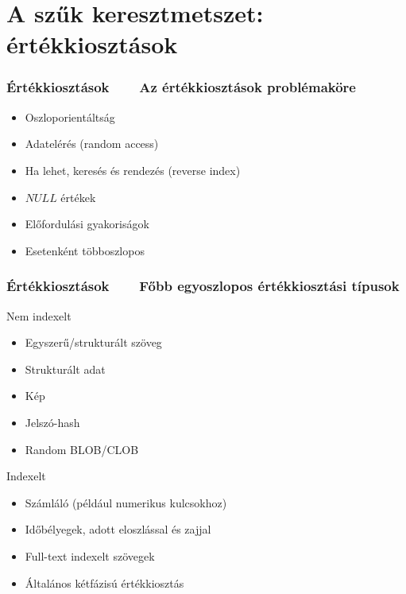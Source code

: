 \documentclass[
]{beamer}
\newcommand{\slidetitle}[2]{\frametitle{{\small #1 ~ \ding{226} ~ } \normalsize \textbf{#2} }}
\begin{document}
\section{A szűk keresztmetszet: értékkiosztások}
\def\sectionshorttitle{Értékkiosztások}

\begin{frame}
    \slidetitle{\sectionshorttitle}{Az értékkiosztások problémaköre}

    \begin{itemize}
        \setlength\itemsep{1em}
        \pause \item Oszloporientáltság
        \pause \item Adatelérés (random access)
        \pause \item Ha lehet, keresés és rendezés (reverse index)
        \pause \item $NULL$ értékek
        \pause \item Előfordulási gyakoriságok
        \pause \item Esetenként többoszlopos
    \end{itemize}
\end{frame}

\begin{frame}
    \slidetitle{\sectionshorttitle}{Főbb egyoszlopos értékkiosztási típusok}

    \pause Nem indexelt
    
    \begin{itemize}
        \pause \item Egyszerű/strukturált szöveg
        \pause \item Strukturált adat
        \pause \item Kép
        \pause \item Jelszó-hash
        \pause \item Random BLOB/CLOB
    \end{itemize}
    
    \pause Indexelt
    
    \begin{itemize}
        \pause \item Számláló (például numerikus kulcsokhoz)
        \pause \item Időbélyegek, adott eloszlással és zajjal
        \pause \item Full-text indexelt szövegek
        \pause \item Általános kétfázisú értékkiosztás
    \end{itemize}
    
\end{frame}
\end{document}
